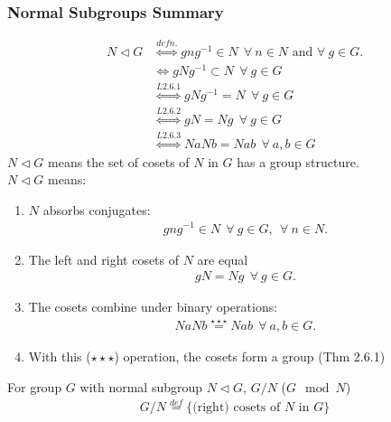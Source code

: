 \subsubsection{Normal Subgroups Summary}
\begin{align}
    N\triangleleft G &\overset{defn.}{\iff} gng^{-1}\in N \ \ \forall \ n\in N \text{ and } \forall \ g \in G. \nonumber \\
    &\overset{}{\iff} gNg^{-1}\subset N \ \ \forall \ g \in G \nonumber \\
    &\overset{L2.6.1}{\iff} gNg^{-1} = N \ \ \forall \ g \in G \nonumber \\
    &\overset{L2.6.2}{\iff} gN = Ng \ \ \forall \ g \in G \nonumber \\
    &\overset{L2.6.3}{\iff} NaNb = Nab \ \ \forall \ a,b \in G \nonumber 
\end{align}
$N\triangleleft G$ means the set of cosets of $N$ in $G$ has a group structure.\steezybreak\\
$N\triangleleft G$ means:
\begin{enumerate}
    \item $N$ absorbs conjugates:
    \begin{align}
        gng^{-1}\in N \ \ \forall \ g \in G, \ \ \forall \ n \in N. \nonumber 
    \end{align}
    \item The left and right cosets of $N$ are equal
    \begin{align}
        gN=Ng \ \ \forall \ g \in G. \nonumber 
    \end{align}
    \item The cosets combine under binary operations:
    \begin{align}
        NaNb\overset{\star\star\star}{=}Nab \ \ \forall \ a,b \in G. \nonumber
    \end{align}
    \item With this ($\star\star\star$) operation, the cosets form a group (Thm 2.6.1)
\end{enumerate}
\begin{definition}
For group $G$ with normal subgroup $N\triangleleft G$, $G/N$ ($G \mod N$)
\begin{align}
    G/N\overset{def}{=}\{\text{(right) cosets of }N \text{ in } G\}\nonumber
\end{align}
\end{definition}
\newpage
